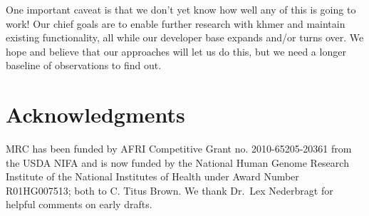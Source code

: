 \documentclass[12pt]{article}
\begin{document}
One important caveat is that we don't yet know how well any of this is
going to work!  Our chief goals are to enable further research with
khmer and maintain existing functionality, all while our
developer base expands and/or turns over. We hope and believe that our
approaches will let us do this, but we need a longer baseline of
observations to find out.


\section*{Acknowledgments}

MRC has been funded by AFRI Competitive Grant no. 2010-65205-20361
from the USDA NIFA and is now funded by the National Human Genome
Research Institute of the National Institutes of Health under Award
Number R01HG007513; both to C. Titus Brown.  We thank Dr.\ Lex
Nederbragt for helpful comments on early drafts.








\end{document}
